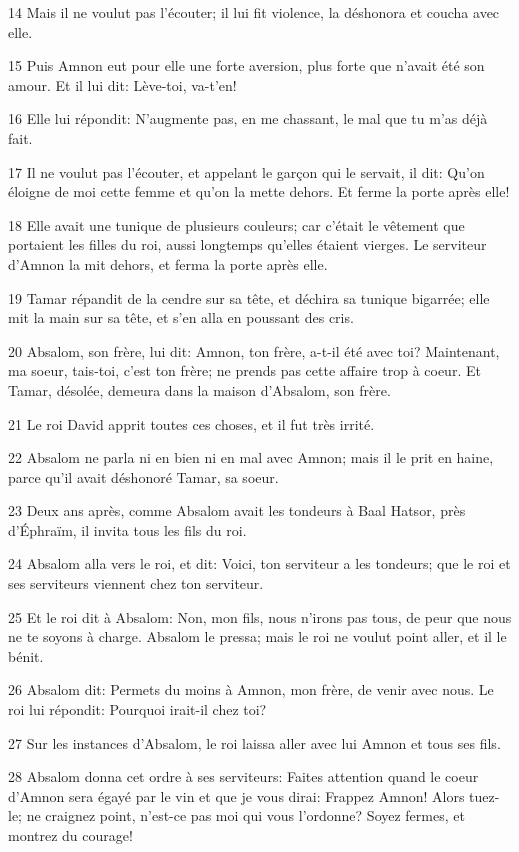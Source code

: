 \par 14 Mais il ne voulut pas l'écouter; il lui fit violence, la déshonora et coucha avec elle.
\par 15 Puis Amnon eut pour elle une forte aversion, plus forte que n'avait été son amour. Et il lui dit: Lève-toi, va-t'en!
\par 16 Elle lui répondit: N'augmente pas, en me chassant, le mal que tu m'as déjà fait.
\par 17 Il ne voulut pas l'écouter, et appelant le garçon qui le servait, il dit: Qu'on éloigne de moi cette femme et qu'on la mette dehors. Et ferme la porte après elle!
\par 18 Elle avait une tunique de plusieurs couleurs; car c'était le vêtement que portaient les filles du roi, aussi longtemps qu'elles étaient vierges. Le serviteur d'Amnon la mit dehors, et ferma la porte après elle.
\par 19 Tamar répandit de la cendre sur sa tête, et déchira sa tunique bigarrée; elle mit la main sur sa tête, et s'en alla en poussant des cris.
\par 20 Absalom, son frère, lui dit: Amnon, ton frère, a-t-il été avec toi? Maintenant, ma soeur, tais-toi, c'est ton frère; ne prends pas cette affaire trop à coeur. Et Tamar, désolée, demeura dans la maison d'Absalom, son frère.
\par 21 Le roi David apprit toutes ces choses, et il fut très irrité.
\par 22 Absalom ne parla ni en bien ni en mal avec Amnon; mais il le prit en haine, parce qu'il avait déshonoré Tamar, sa soeur.
\par 23 Deux ans après, comme Absalom avait les tondeurs à Baal Hatsor, près d'Éphraïm, il invita tous les fils du roi.
\par 24 Absalom alla vers le roi, et dit: Voici, ton serviteur a les tondeurs; que le roi et ses serviteurs viennent chez ton serviteur.
\par 25 Et le roi dit à Absalom: Non, mon fils, nous n'irons pas tous, de peur que nous ne te soyons à charge. Absalom le pressa; mais le roi ne voulut point aller, et il le bénit.
\par 26 Absalom dit: Permets du moins à Amnon, mon frère, de venir avec nous. Le roi lui répondit: Pourquoi irait-il chez toi?
\par 27 Sur les instances d'Absalom, le roi laissa aller avec lui Amnon et tous ses fils.
\par 28 Absalom donna cet ordre à ses serviteurs: Faites attention quand le coeur d'Amnon sera égayé par le vin et que je vous dirai: Frappez Amnon! Alors tuez-le; ne craignez point, n'est-ce pas moi qui vous l'ordonne? Soyez fermes, et montrez du courage!
